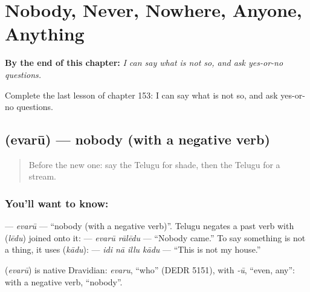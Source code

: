 
\chapter{Nobody, Never, Nowhere, Anyone, Anything}
\label{ch:te-nobody-never-nowhere-anyone-anything}

\begin{chapteropening}
\textbf{By the end of this chapter:} \emph{I can say what is not so, and ask yes-or-no questions.}

Complete the last lesson of chapter 153: I can say what is not so, and ask yes-or-no questions.
\end{chapteropening}

\section[\texorpdfstring{\te{ఎవరూ} (evarū)}{ఎవరూ (evarū)}]{ (evarū) — nobody (with a negative verb)}

\label{lesson:TE-C153-evaru}



\begin{quote}
Before the new one: say the Telugu for shade, then the Telugu for a stream.
\end{quote}

\subsection*{You'll want to know: }
\textbf{} — \emph{evarū} — \textquotedblleft{}nobody (with a negative verb)\textquotedblright{}. Telugu negates a past verb with \textbf{} (\emph{lēdu}) joined onto it: \textbf{ } — \emph{evarū rālēdu} — \textquotedblleft{}Nobody came.\textquotedblright{} To say something is not a thing, it uses \textbf{} (\emph{kādu}): \textbf{   } — \emph{idi nā illu kādu} — \textquotedblleft{}This is not my house.\textquotedblright{}

\begin{cousinweb}
\textbf{} (\emph{evarū}) is native Dravidian: \emph{evaru}, \textquotedblleft{}who\textquotedblright{} (DEDR 5151), with \emph{-ū}, \textquotedblleft{}even, any\textquotedblright{}: with a negative verb, \textquotedblleft{}nobody\textquotedblright{}.
\end{cousinweb}

